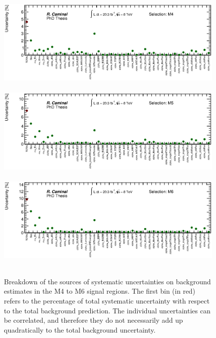 \begin{figure}[!ht]
  \begin{center}
    \mbox{
      \includegraphics[width=0.995\textwidth]{MonojetAnalysis/Figures/totalSystematicPlot_SR_Stop_A8.eps}
    }
    \mbox{
      \includegraphics[width=0.995\textwidth]{MonojetAnalysis/Figures/totalSystematicPlot_SR_Stop_A9.eps}
    }
    \mbox{
      \includegraphics[width=0.995\textwidth]{MonojetAnalysis/Figures/totalSystematicPlot_SR_Stop_A10.eps}
    }
  \end{center}
  \caption[Breakdown of the sources of systematic uncertainties on background estimates in the M4 to M6 signal regions.]{Breakdown of the sources of systematic uncertainties on background estimates in the M4 to M6 signal regions. The first bin (in red) refers to the percentage of total systematic uncertainty with respect to the total background prediction. The individual uncertainties can be correlated, and therefore they do not necessarily add up quadratically to the total background uncertainty.}
  \label{fig:SystematicUncertaintiesSR2}
\end{figure}

